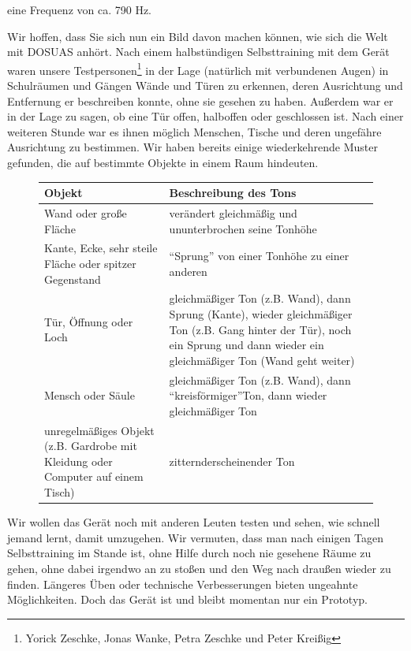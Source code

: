 \documentclass[a4paper,12pt,ngerman]{scrartcl}
\begin{document}
eine Frequenz von ca. 790 Hz.\par 
Wir hoffen, dass Sie sich nun ein Bild davon machen können, wie sich die Welt mit DOSUAS anhört. Nach einem
halbstündigen Selbsttraining mit dem Gerät waren unsere Testpersonen\footnote{Yorick Zeschke, Jonas Wanke, Petra Zeschke und Peter Kreißig} in der Lage (natürlich mit verbundenen Augen) in Schulräumen und Gängen
Wände und Türen zu erkennen, deren Ausrichtung und Entfernung er beschreiben konnte, ohne sie gesehen zu haben.
Außerdem war er in der Lage zu sagen, ob eine Tür offen, halboffen oder geschlossen ist. Nach einer weiteren Stunde
war es ihnen möglich Menschen, Tische und deren ungefähre Ausrichtung zu bestimmen. 
Wir haben bereits einige wiederkehrende Muster gefunden, die auf bestimmte Objekte in einem Raum hindeuten. 
\begin{figure}[h]
	\begin{tabular}{| p{} | p{} |}
		\hline
		Objekt & Beschreibung des Tons \\ \hline
		Wand oder große Fläche & verändert gleichmäßig und ununterbrochen seine Tonhöhe \\ \hline
		Kante, Ecke, sehr steile Fläche oder spitzer Gegenstand & \enquote{Sprung} von einer Tonhöhe zu einer 
		anderen \\ \hline
		Tür, Öffnung oder Loch & gleichmäßiger Ton (z.B. Wand), dann Sprung (Kante), wieder gleichmäßiger Ton
		(z.B. Gang hinter der Tür), noch ein Sprung und dann wieder ein gleichmäßiger Ton (Wand geht weiter) \\ \hline 
		Mensch oder Säule & gleichmäßiger Ton (z.B. Wand), dann \enquote{kreisförmiger}\footnotemark Ton, dann wieder gleichmäßiger Ton \\ \hline
		unregelmäßiges Objekt (z.B. Gardrobe mit Kleidung oder Computer auf einem Tisch) & zitternd\footnotemark erscheinender Ton \\ \hline 
	\end{tabular}
\end{figure} \par
{}
Wir wollen das Gerät noch mit
anderen Leuten testen und sehen, wie schnell jemand lernt, damit umzugehen. Wir vermuten, dass man nach einigen 
Tagen Selbsttraining im Stande ist, ohne Hilfe durch noch nie gesehene Räume zu gehen, ohne dabei irgendwo an zu
stoßen und den Weg nach draußen wieder zu finden. Längeres Üben oder technische Verbesserungen bieten ungeahnte
Möglichkeiten. Doch das Gerät ist und bleibt momentan nur ein Prototyp. 
\end{document}
